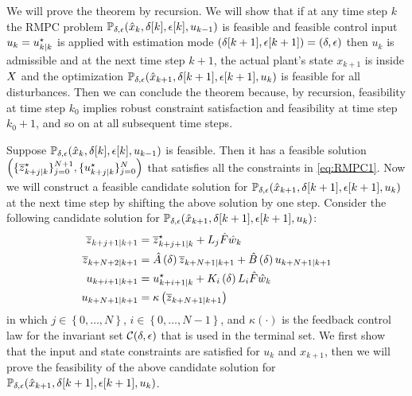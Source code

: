 %
We will prove the theorem by recursion. We will show that if at any
time step $k$ the RMPC problem $\mathbb{P_{\delta,\epsilon}}(\hat{x}_{k},\delta[k],\epsilon[k],u_{k-1})$
is feasible and feasible control input $u_{k}=u_{k| k}^{\star}$
is applied with estimation mode $\left(\delta[k+1],\epsilon[k+1]\right)=\left(\delta,\epsilon\right)$
then $u_{k}$ is admissible and at the next time step $k+1$, the
actual plant's state $x_{k+1}$ is inside $X$ and the optimization
$\mathbb{P_{\delta,\epsilon}}(\hat{x}_{k+1},\delta[k+1],\epsilon[k+1],u_{k})$
is feasible for all disturbances. Then we can conclude the theorem
because, by recursion, feasibility at time step $k_{0}$ implies robust
constraint satisfaction and feasibility at time step $k_{0}+1$, and
so on at all subsequent time steps.

Suppose $\mathbb{P_{\delta,\epsilon}}(\hat{x}_{k},\delta[k],\epsilon[k],u_{k-1})$
is feasible. Then it has a feasible solution $\left(\{ \overline{z}_{k+j| k}^{\star}\} _{j=0}^{N+1},\{ u_{k+j| k}^{\star}\} _{j=0}^{N}\right)$
that satisfies all the constraints in \eqref{eq:RMPC1}. Now we will
construct a feasible candidate solution for $\mathbb{P_{\delta,\epsilon}}(\hat{x}_{k+1},\delta[k+1],\epsilon[k+1],u_{k})$
at the next time step by shifting the above solution by one step.
Consider the following candidate solution for $\mathbb{P_{\delta,\epsilon}}(\hat{x}_{k+1},\delta[k+1],\epsilon[k+1],u_{k})$:
\begin{subequations}
\label{eq:proofs:candidate-solution}
\begin{align}
\overline{z}_{k+j+1| k+1} & =\overline{z}_{k+j+1| k}^{\star}+L_{j}\hat{F}\hat{w}_{k}\label{eq:proofs:candidate-solution:zj}\\
\overline{z}_{k+N+2| k+1} & =\hat{A}\left(\delta\right)\overline{z}_{k+N+1| k+1}+\hat{B}\left(\delta\right)u_{k+N+1| k+1}\label{eq:proofs:candidate-solution:zN}\\
u_{k+i+1| k+1} & =u_{k+i+1| k}^{\star}+K_{i}\left(\delta\right)L_{i}\hat{F}\hat{w}_{k}\label{eq:proofs:candidate-solution:uj}\\
u_{k+N+1| k+1} & =\kappa\left(\overline{z}_{k+N+1| k+1}\right)\label{eq:proofs:candidate-solution:uN}
\end{align}
\end{subequations} in which
$j\in\left\{ 0,\dots,N\right\} $, $i\in\left\{ 0,\dots,N-1\right\} $,
and $\kappa\left(\cdot\right)$ is the feedback control law for the
invariant set $\mathcal{C}(\delta,\epsilon)$ that is used in the terminal
set. We first show that the input and
state constraints are satisfied for $u_{k}$ and $x_{k+1}$, then
we will prove the feasibility of the above candidate solution for
$\mathbb{P_{\delta,\epsilon}}(\hat{x}_{k+1},\delta[k+1],\epsilon[k+1],u_{k})$.

